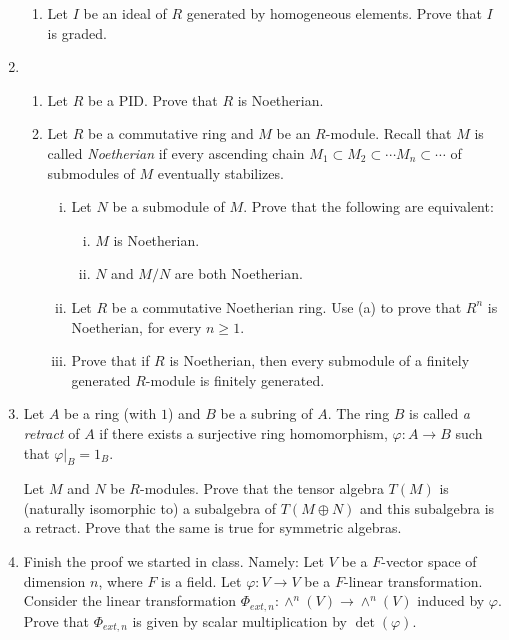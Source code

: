 \documentclass[12pt,
psamsfonts]{amsart}
\theoremstyle{remark}
\theoremstyle{definition}
\newcommand{\Z}{\mathbb{Z}\xspace}
\numberwithin{equation}{section}
\begin{document}
\begin{enumerate}
\begin{enumerate}
\item Let $I$ be an ideal of $R$ generated by homogeneous elements. Prove that $I$ is graded. 
\end{enumerate}
\medskip 
\item
\begin{enumerate}
\item  Let $R$ be a PID. Prove that $R$ is Noetherian.
\item Let $R$ be a commutative ring and $M$ be an $R$-module.
Recall that $M$ is called \textit{Noetherian} if every ascending chain $M_1\subset M_2\subset \cdots M_n\subset\cdots$ of submodules of $M$ eventually stabilizes. 
\begin{enumerate}[(i)]\item Let $N$ be a submodule of $M$. Prove that the following are equivalent: 
 \begin{enumerate}
 [(i)]\item $M$ is Noetherian.
 \item $N$ and $M/N$ are both Noetherian. 
 \end{enumerate}
 \item Let $R$ be a commutative Noetherian ring. Use (a) to prove that $R^n$ is Noetherian, for every $n\geq 1$. 
 \item Prove that if $R$ is Noetherian, then every submodule of a finitely generated $R$-module is finitely generated. 
\end{enumerate}
\end{enumerate} 
\medskip 
\item Let $A$ be a ring (with $1$) and $B$ be a subring of $A$. The ring $B$ is called \textit{a retract} of $A$ if there exists a surjective ring homomorphism, $\varphi:A\rightarrow B$ such that $\varphi|_{B}=1_B$. 

Let $M$ and $N$ be $R$-modules. Prove that the tensor algebra $T(M)$ is (naturally isomorphic to) a subalgebra of $T(M\oplus N)$ and this subalgebra is a retract. Prove that the same is true for symmetric algebras. \\

\item Finish the proof we started in class. Namely: Let $V$ be a  $F$-vector space of dimension $n$, where $F$ is a field. Let $\varphi:V\rightarrow V$ be a $F$-linear transformation. Consider the linear transformation $\Phi_{ext,n}:\wedge^n(V)\rightarrow\wedge^n(V)$ induced by $\varphi$. Prove that $\Phi_{ext,n}$ is given by scalar multiplication by $\det(\varphi)$. 


\end{enumerate}
\end{document}
